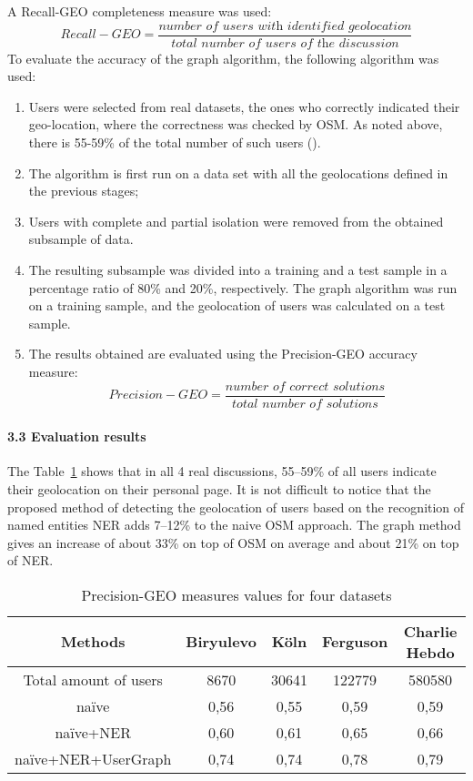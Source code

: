 A Recall-GEO completeness measure was used:
\[
\textit{Recall} - \textit{GEO} = \frac{\textit{number of users with identified geolocation}}{\textit{total number of users of the discussion}}
\]
To evaluate the accuracy of the graph algorithm, the following algorithm was used:
\begin{enumerate}
	\item Users were selected from real datasets, the ones who correctly indicated their geo-location, where the correctness was checked by OSM. As noted above, there is 55-59\% of the total number of such users ().
	\item The algorithm is first run on a data set with all the geolocations defined in the previous stages;
	\item Users with complete and partial isolation were removed from the obtained subsample of data.
	\item The resulting subsample was divided into a training and a test sample in a percentage ratio of 80\% and 20\%, respectively. The graph algorithm was run on a training sample, and the geolocation of users was calculated on a test sample.
	\item The results obtained are evaluated using the Precision-GEO accuracy measure: \[
	\textit{Precision} - \textit{GEO} = \frac{\textit{number of correct solutions}}{\textit{total number of solutions}}
	\]
\end{enumerate}

\paragraph{3.3 Evaluation results} The Table~\cref{tab:precisionGEOValues1} shows that in all 4 real discussions, 55--59\% of all users indicate their geolocation on their personal page. It is not difficult to notice that the proposed method of detecting the geolocation of users based on the recognition of named entities NER adds 7--12\% to the naive OSM approach. The graph method gives an increase of about 33\% on top of OSM on average and about 21\% on top of NER.

\begin{table}[ht]%
	\centering
	\caption{Precision-GEO measures values for four datasets}%
	\label{tab:precisionGEOValues1}%
		\begin{tabular}{ c  c  c  c  c }%
			\toprule
			Methods & Biryulevo & Köln & Ferguson & Charlie Hebdo\\
			\hline
			Total amount of users & 8670 & 30641 & 122779 & 580580\\
			naïve & 0,56 & 0,55 & 0,59 & 0,59\\
			naïve+NER & 0,60 & 0,61 & 0,65 & 0,66\\
			naïve+NER+UserGraph & 0,74 & 0,74 & 0,78 & 0,79\\
			\bottomrule
		\end{tabular}%
\end{table}

